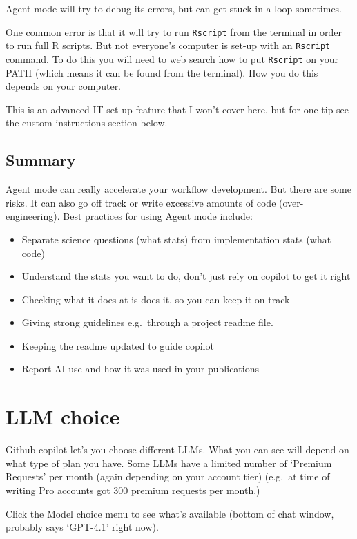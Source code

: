 \documentclass[
  letterpaper,
  DIV=11,
  numbers=noendperiod]{scrreprt}
\providecommand{\tightlist}{%
  \setlength{\itemsep}{0pt}\setlength{\parskip}{0pt}}\usepackage{longtable,booktabs,array}
\begin{document}
Agent mode will try to debug its errors, but can get stuck in a loop
sometimes.

One common error is that it will try to run \texttt{Rscript} from the
terminal in order to run full R scripts. But not everyone's computer is
set-up with an \texttt{Rscript} command. To do this you will need to web
search how to put \texttt{Rscript} on your PATH (which means it can be
found from the terminal). How you do this depends on your computer.

This is an advanced IT set-up feature that I won't cover here, but for
one tip see the custom instructions section below.

\subsection{Summary}\label{summary-1}

Agent mode can really accelerate your workflow development. But there
are some risks. It can also go off track or write excessive amounts of
code (over-engineering). Best practices for using Agent mode include:

\begin{itemize}
\tightlist
\item
  Separate science questions (what stats) from implementation stats
  (what code)
\item
  Understand the stats you want to do, don't just rely on copilot to get
  it right
\item
  Checking what it does at is does it, so you can keep it on track
\item
  Giving strong guidelines e.g.~through a project readme file.
\item
  Keeping the readme updated to guide copilot
\item
  Report AI use and how it was used in your publications
\end{itemize}

\section{LLM choice}\label{llm-choice}

Github copilot let's you choose different LLMs. What you can see will
depend on what type of plan you have. Some LLMs have a limited number of
`Premium Requests' per month (again depending on your account tier)
(e.g.~at time of writing Pro accounts got 300 premium requests per
month.)

Click the Model choice menu to see what's available (bottom of chat
window, probably says `GPT-4.1' right now).
\end{document}
